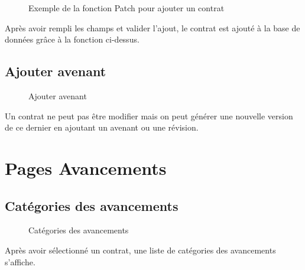\documentclass[a4paper]{report}
\begin{document}
\begin{doublespace}
\begin{figure}[H]
\begin{center}
			\caption{Exemple de la fonction Patch pour ajouter un contrat}
		\end{center}
	\end{figure}
	Après avoir rempli les champs et valider l'ajout, le contrat est ajouté à la base de données grâce à la fonction ci-dessus.
	\subsection{Ajouter avenant}
	\begin{figure}[H]
		\begin{center}
			\caption{Ajouter avenant}
		\end{center}
	\end{figure}
	Un contrat ne peut pas être modifier mais on peut générer une nouvelle version de ce dernier en ajoutant un avenant ou une révision.
	\section{Pages Avancements}
	\subsection{Catégories des avancements}
	\begin{figure}[H]
		\begin{center}
			\caption{Catégories des avancements}
		\end{center}
	\end{figure}
	Après avoir sélectionné un contrat, une liste de catégories des avancements s'affiche.

\end{doublespace}
\end{document}
